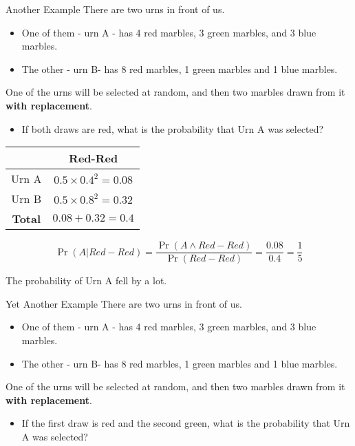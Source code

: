 \documentclass[
  ignorenonframetext,
]{beamer}
\providecommand{\tightlist}{%
  \setlength{\itemsep}{0pt}\setlength{\parskip}{0pt}}
\renewcommand{\,}{\text{, }}
\begin{document}
\begin{frame}{Another Example}
\protect\hypertarget{another-example}{}
There are two urns in front of us.

\begin{itemize}
\tightlist
\item
  One of them - urn A - has 4 red marbles, 3 green marbles, and 3 blue
  marbles.
\item
  The other - urn B- has 8 red marbles, 1 green marbles and 1 blue
  marbles. \pause
\end{itemize}

One of the urns will be selected at random, and then two marbles drawn
from it \textbf{with replacement}.

\begin{itemize}
\tightlist
\item
  If both draws are red, what is the probability that Urn A was
  selected?
\end{itemize}
\end{frame}

\begin{frame}
\begin{longtable}[]{@{}cc@{}}
\toprule
& Red-Red \\
\midrule
\endhead
Urn A & \(0.5 \times 0.4^2 = 0.08\) \\
Urn B & \(0.5 \times 0.8^2 = 0.32\) \\
\textbf{Total} & \(0.08 + 0.32 = 0.4\) \\
\bottomrule
\end{longtable}

\[
\Pr(A | Red-Red) = \frac{\Pr(A \wedge Red-Red)}{\Pr(Red-Red)} = \frac{0.08}{0.4} = \frac{1}{5}
\]

\bigskip

The probability of Urn A fell by a lot.
\end{frame}

\begin{frame}{Yet Another Example}
\protect\hypertarget{yet-another-example}{}
There are two urns in front of us.

\begin{itemize}
\tightlist
\item
  One of them - urn A - has 4 red marbles, 3 green marbles, and 3 blue
  marbles.
\item
  The other - urn B- has 8 red marbles, 1 green marbles and 1 blue
  marbles. \pause
\end{itemize}

One of the urns will be selected at random, and then two marbles drawn
from it \textbf{with replacement}.

\begin{itemize}
\tightlist
\item
  If the first draw is red and the second green, what is the probability
  that Urn A was selected?
\end{itemize}
\end{frame}
\end{document}

